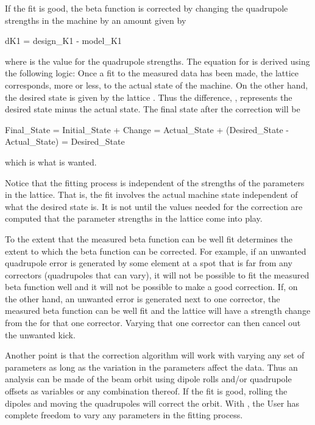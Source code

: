 {{{If the fit is good, the beta function is corrected by changing the
quadrupole strengths in the machine by an amount  given by
\begin{example}
  dK1 = design_K1 - model_K1
\end{example}
where  is the  value for the quadrupole strengths. The equation for
 is derived using the following logic: Once a fit to the measured data has been made, the
 lattice corresponds, more or less, to the actual state of the machine. On the other hand,
the desired state is given by the  lattice . Thus the difference, ,
represents the desired state minus the actual state. The final state after the
correction will be
\begin{example}
  Final_State = Initial_State + Change
              = Actual_State + (Desired_State - Actual_State)
              = Desired_State
\end{example}
which is what is wanted.

Notice that the fitting process is independent of the strengths of the parameters in the
 lattice. That is, the fit involves the actual machine state independent of what the
desired state is. It is not until the values needed for the correction are computed that the
parameter strengths in the  lattice come into play.

To the extent that the measured beta function can be well fit determines the extent to which the
beta function can be corrected. For example, if an unwanted quadrupole error is generated by some
element at a spot that is far from any correctors (quadrupoles that can vary), it will not be possible to
fit the measured beta function well and it will not be possible to make a good correction. If, on
the other hand, an unwanted error is generated next to one corrector, the measured beta function can
be well fit and the  lattice will have a strength change from the  for that one
corrector. Varying that one corrector can then cancel out the unwanted kick.

Another point is that the correction algorithm will work with varying any set of parameters as long
as the variation in the parameters affect the  data. Thus an analysis can be made of the
beam orbit using dipole rolls and/or quadrupole offsets as variables or any combination thereof. If
the fit is good, rolling the dipoles and moving the quadrupoles will correct the orbit. With \tao,
the User has complete freedom to vary any parameters in the fitting process.

}}}
